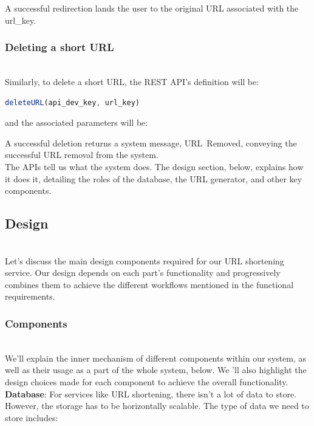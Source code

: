A successful redirection lands the user to the original URL associated with the url\_key.

\subsubsection{Deleting a short URL}\label{nuIa_ROVHXQczuQIxBNmE}
\\
Similarly, to delete a short URL, the REST API's definition will be:

\begin{lstlisting}[language=JavaScript]
deleteURL(api_dev_key, url_key)
\end{lstlisting}

and the associated parameters will be:

\begin{table}[htbp]
\centering
\small
{}
\end{table}

A successful deletion returns a system message, URL\ Removed, conveying the successful URL removal from the system.
\\
The APIs tell us what the system does. The design section, below, explains how it does it, detailing the roles of the database, the URL generator, and other key components.

\subsection{Design}\label{QWkx8ccY35z5DFdB4vVKp}
\\
Let's discuss the main design components required for our URL shortening service. Our design depends on each part's functionality and progressively combines them to achieve the different workflows mentioned in the functional requirements.

\subsubsection{Components}\label{QjdfyUgZy1pAlWPPNARRN}
\\
We'll explain the inner mechanism of different components within our system, as well as their usage as a part of the whole system, below. We 'll also highlight the design choices made for each component to achieve the overall functionality.
\\
\textbf{Database}: For services like URL shortening, there isn't a lot of data to store. However, the storage has to be horizontally scalable. The type of data we need to store includes:

